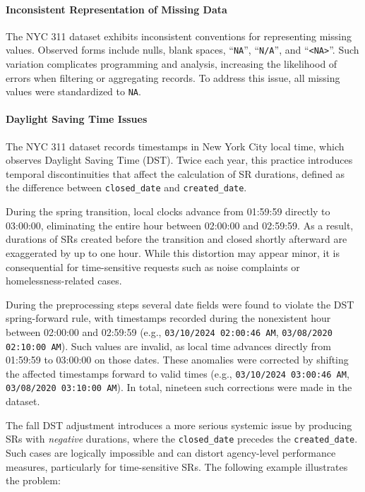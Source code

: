 \documentclass[linenumber]{jdsart}
\begin{document}
\paragraph{Inconsistent Representation of Missing Data}
\label{par:missingdata}
The \textsc{NYC 311} dataset exhibits inconsistent conventions for representing 
missing values. Observed forms include nulls, blank spaces, 
``\texttt{NA}'', ``\texttt{N/A}'', and ``\texttt{<NA>}''. 
Such variation complicates programming and analysis, increasing the likelihood 
of errors when filtering or aggregating records. To address this 
issue, all missing values were standardized to \texttt{NA}.

\paragraph{Daylight Saving Time Issues}
\label{par:dst}
The \textsc{NYC 311} dataset records timestamps in New York City local time, 
which observes Daylight Saving Time (DST). 
Twice each year, this practice introduces temporal discontinuities that affect 
the calculation of SR durations, defined as the difference 
between \texttt{closed\_date} and \texttt{created\_date}. 

During the spring transition, local clocks advance from 01:59:59 directly to 
03:00:00, eliminating the entire hour between 02:00:00 and 02:59:59. 
As a result, durations of SRs created before the transition and closed shortly 
afterward are exaggerated by up to one hour. 
While this distortion may appear minor, it is consequential for 
time-sensitive requests such as noise complaints or homelessness-related cases.

During the preprocessing steps several date fields were found to 
violate the DST spring-forward rule, with timestamps recorded during the 
nonexistent hour between 02:00:00 and 02:59:59 
(e.g., \texttt{03/10/2024 02:00:46 AM}, \texttt{03/08/2020 02:10:00 AM}). 
Such values are invalid, as local time advances directly from 01:59:59 to 
03:00:00 on those dates. 
These anomalies were corrected by shifting the affected timestamps forward 
to valid times 
(e.g., \texttt{03/10/2024 03:00:46 AM}, \texttt{03/08/2020 03:10:00 AM}). 
In total, nineteen such corrections were made in the dataset.

The fall DST adjustment introduces a more serious systemic issue by producing 
SRs with \emph{negative} durations, where the 
\texttt{closed\_date} precedes the \texttt{created\_date}. 
Such cases are logically impossible and can distort agency-level performance 
measures, particularly for time-sensitive SRs. 
The following example illustrates the problem:
\end{document}
